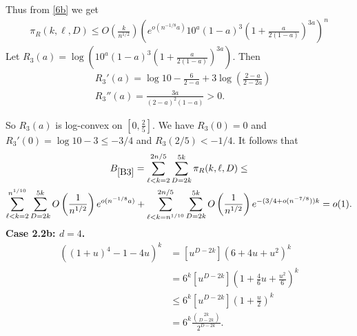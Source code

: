 \documentclass[11pt]{article}
\def\p{\pi}
\newcommand{\brac}[1]{\left(#1\right)}
\newcommand{\bfrac}[2]{\brac{\frac{#1}{#2}}}
\begin{document}
Thus from \eqref{6b} we get 
\begin{align*}
\p_R(k,\ell,D)\leq O\bfrac{k}{n^{1/2}}\brac{e^{o(n^{-1/8}a)}10^a(1-a)^{3}\brac{1+\frac{a}{2(1-a)}}^{3a}}^n
\end{align*}
Let $R_3(a)=\log\brac{10^a(1-a)^{3}\brac{1+\frac{a}{2(1-a)}}^{3a}}$. Then
\begin{align*}
&R_3'(a)=\log 10-\frac{6}{2-a}+3\log\bfrac{2-a}{2-2a}\\
&R_3''(a)=\frac{3a}{(2-a)^2(1-a)}>0.
\end{align*}

So $R_3(a)$ is log-convex on $[0,\frac{2}{5}]$. We have $R_3(0)=0$ and $R_3'(0)=\log 10 -3\leq -3/4$
and $R_3(2/5)<-1/4$. It follows that
\begin{multline}\label{B3}
B_{\ref{B3}}=\sum_{\ell<k=2}^{2n/5}\sum_{D=2k}^{5k}
\p_R(k,\ell,D)\leq \\
\sum_{\ell<k=2}^{n^{1/10}}\sum_{D=2k}^{5k}O\bfrac{1}{n^{1/2}}e^{o(n^{-1/8}a)}+
\sum_{\ell<k=n^{1/10}}^{2n/5}\sum_{D=2k}^{5k}O\bfrac{1}{n^{1/2}}e^{-(3/4+o(n^{-7/8}))k}=o(1).
\end{multline}
{\bf Case 2.2b: $d=4$.}
\begin{align*}
[u^D]((1+u)^4-1-4u)^k &= [u^{D-2k}](6+4u+u^2)^k\\
&= 6^k[u^{D-2k}]\brac{1+\frac{4}{6}u+\frac{u^2}{6}}^k\\
&\le 6^k[u^{D-2k}]\brac{1+\frac{u}{2}}^k\\
&= 6^k\frac{\binom{2k}{D-2k}}{2^{D-2k}}.
\end{align*}
\end{document}
